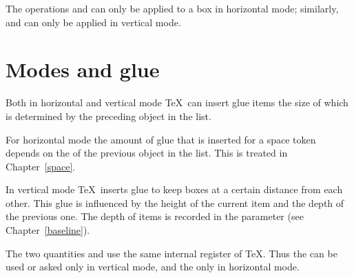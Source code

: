 \documentclass[twoside,letterpaper,openright]{rapport3}
\begin{document}
The operations  and  can only be
applied to a box in horizontal mode; similarly,  and
 can only be applied in vertical mode.


\section{Modes and glue}

Both in horizontal and vertical mode
\TeX\ can insert glue items the size of which is
determined by the preceding object in the list.

For horizontal mode the amount of glue that is inserted
for a space token depends on the  of
the previous object in the list. This is treated
in Chapter~\ref{space}.

In vertical mode \TeX\ inserts glue to keep boxes at a certain
distance from each other. This glue is influenced by the
height of the current item and the depth of the previous one.
The depth of items is recorded in the  parameter
(see Chapter~\ref{baseline}).

The two quantities  
and  
use the same internal register of \TeX. Thus the 
can be used or asked only in vertical mode, and the 
only in horizontal mode.
\end{document}
